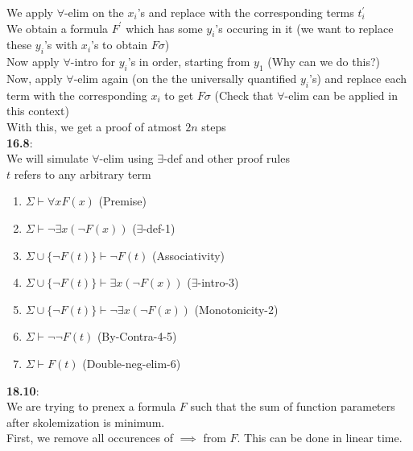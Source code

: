 \documentclass{article}
\begin{document}
\begin{flushleft}
We apply $\forall$-elim on the $x_i$'s and replace with the corresponding terms $t_i^{'}$\\
We obtain a formula $F^{'}$ which has some $y_i$'s occuring in it (we want to replace these $y_i$'s with $x_i$'s to obtain $F\sigma$)\\
Now apply $\forall$-intro for $y_i$'s in order, starting from $y_1$ (Why can we do this?)\\
Now, apply $\forall$-elim again (on the the universally quantified $y_i$'s) and replace each term with the corresponding $x_i$ to get $F\sigma$ (Check that $\forall$-elim can be applied in this context)\\
With this, we get a proof of atmost $2n$ steps\\
\textbf{16.8}: \\
We will simulate $\forall$-elim using $\exists$-def and other proof rules\\
$t$ refers to any arbitrary term \\
\begin{enumerate}
    \item $\Sigma \vdash \forall x F(x)$ \hspace{2mm} (Premise)
    \item $\Sigma \vdash \neg \exists x (\neg F(x))$ \hspace{2mm} ($\exists$-def-1)
    \item $\Sigma \cup \{{\neg F(t)}\} \vdash \neg F(t)$ \hspace{2mm} (Associativity)
    \item $\Sigma \cup \{{\neg F(t)}\} \vdash \exists x (\neg F(x))$ \hspace{2mm} ($\exists$-intro-3)
    \item $\Sigma \cup \{{\neg F(t)}\} \vdash \neg \exists x(\neg F(x))$ \hspace{2mm} (Monotonicity-2)
    \item $\Sigma \vdash \neg \neg F(t)$  \hspace{2mm} (By-Contra-4-5)
    \item  $\Sigma \vdash F(t)$  \hspace{2mm} (Double-neg-elim-6)
\end{enumerate}
\textbf{18.10}: \\
We are trying to prenex a formula $F$ such that the sum of function parameters after skolemization is minimum.\\
First, we remove all occurences of $\implies$ from $F$. This can be done in linear time.\\

\end{flushleft}
\end{document}
